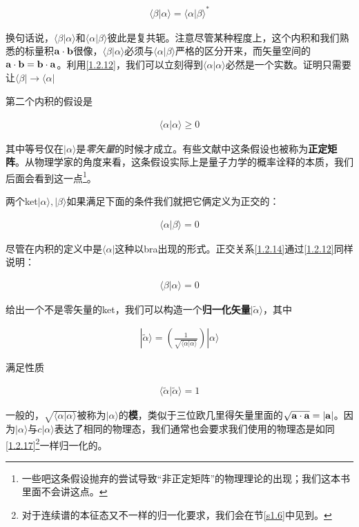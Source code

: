 \documentclass[UTF8,twoside]{ctexart}
\begin{document}
\begin{align}\label{1.2.12}
\langle\beta|\alpha\rangle = \langle\alpha|\beta\rangle^*
\end{align}

\noindent 换句话说，$\langle\beta|\alpha\rangle$和$\langle\alpha|\beta\rangle$彼此是复共轭。注意尽管某种程度上，这个内积和我们熟悉的标量积$\bf a\cdot b$很像，$\langle\beta|\alpha\rangle$必须与$\langle\alpha|\beta\rangle$严格的区分开来，而矢量空间的$\bf a\cdot b = b\cdot a$。利用\eqref{1.2.12}，我们可以立刻得到$\langle\alpha|\alpha\rangle$必然是一个实数。证明只需要让$\langle\beta|\to\langle\alpha|$

第二个内积的假设是

\begin{align}
\langle\alpha|\alpha\rangle\ge0
\end{align}

\noindent 其中等号仅在$|\alpha\rangle$是{\emph{零矢量}}的时候才成立。有些文献中这条假设也被称为{\bf{正定矩阵}}。从物理学家的角度来看，这条假设实际上是量子力学的概率诠释的本质，我们后面会看到这一点\footnote{一些吧这条假设抛弃的尝试导致``非正定矩阵''的物理理论的出现；我们这本书里面不会讲这点。}。

两个ket$|\alpha\rangle,|\beta\rangle$如果满足下面的条件我们就把它俩定义为正交的：

\begin{align}\label{1.2.14}
\langle\alpha|\beta\rangle = 0
\end{align}

\noindent 尽管在内积的定义中是$\langle\alpha|$这种以bra出现的形式。正交关系\eqref{1.2.14}通过\eqref{1.2.12}同样说明：

\begin{align}
\langle\beta|\alpha\rangle = 0
\end{align}

给出一个不是零矢量的ket，我们可以构造一个{\bf 归一化矢量}$|\tilde{\alpha}\rangle$，其中

\begin{align}
|\tilde{\alpha}\rangle = \left(\frac{1}{\sqrt{\langle\alpha|\alpha\rangle}}\right)|\alpha\rangle
\end{align}

\noindent 满足性质

\begin{align}\label{1.2.17}
\langle\tilde{\alpha}|\tilde{\alpha}\rangle = 1
\end{align}

\noindent 一般的，$\sqrt{\langle\alpha|\alpha\rangle}$被称为$|\alpha\rangle$的{\bf 模}，类似于三位欧几里得矢量里面的$\sqrt{\bf a\cdot a} = |\bf a|$。因为$|\alpha\rangle$与$c|\alpha\rangle$表达了相同的物理态，我们通常也会要求我们使用的物理态是如同\eqref{1.2.17}\footnote{对于连续谱的本征态又不一样的归一化要求，我们会在节\ref{s1.6}中见到。}一样归一化的。
\end{document}
